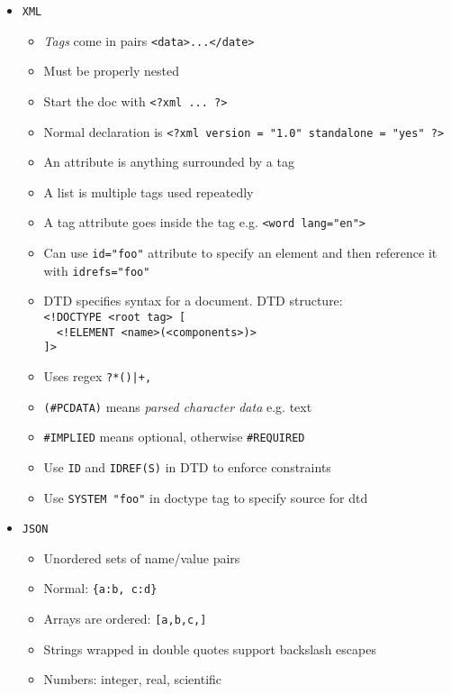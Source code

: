 \documentclass[landscape,8pt]{extarticle}
\newcommand{\code}{\lstinline}
\begin{document}
\begin{multicols}{4}
\begin{itemize}
    \begin{itemize}
        \item \code{XML}
        \begin{itemize}
            \item \emph{Tags} come in pairs \code{<data>...</date>}
            \item Must be properly nested
            \item Start the doc with \code{<?xml ... ?>}
            \item Normal declaration is \code{<?xml version = "1.0" standalone = "yes" ?>}
            \item An attribute is anything surrounded by a tag
            \item A list is multiple tags used repeatedly
            \item A tag attribute goes inside the tag e.g. \code{<word lang="en">}
            \item Can use \code{id="foo"} attribute to specify an element and then reference it with
            \code{idrefs="foo"}
            \item DTD specifies syntax for a document. DTD structure:\\
\code{<!DOCTYPE <root tag> [}\\
\code{  <!ELEMENT <name>(<components>)>}\\
\code{]>}
            \item Uses regex \code{?*()|+,}
            \item \code{(#PCDATA)} means \emph{parsed character data} e.g. text
            \item \code{#IMPLIED} means optional, otherwise \code{#REQUIRED}
            \item Use \code{ID} and \code{IDREF(S)} in DTD to enforce constraints
            \item Use \code{SYSTEM "foo"} in doctype tag to specify source for dtd
        \end{itemize}
        \item \code{JSON}
        \begin{itemize}
            \item Unordered sets of name/value pairs
            \item Normal: \lstinline|{a:b, c:d}|
            \item Arrays are ordered: \code{[a,b,c,]}
            \item Strings wrapped in double quotes support backslash escapes
            \item Numbers: integer, real, scientific

\end{itemize}
\end{itemize}
\end{itemize}
\end{multicols}
\end{document}

